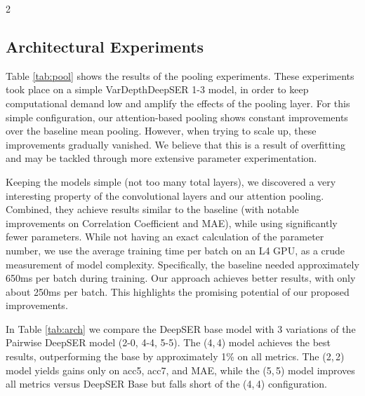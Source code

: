 \documentclass[10pt]{article}
\begin{document}
\begin{multicols}{2}
\subsection{Architectural Experiments}
\par Table \ref{tab:pool} shows the results of the pooling experiments. These experiments took place on a simple VarDepthDeepSER 1-3 model, in order to keep computational demand low and amplify the effects of the pooling layer. For this simple configuration, our attention-based pooling shows constant improvements over the baseline mean pooling. However, when trying to scale up, these improvements gradually vanished. We believe that this is a result of overfitting and may be tackled through more extensive parameter experimentation.
\par Keeping the models simple (not too many total layers), we discovered a very interesting property of the convolutional layers and our attention pooling. Combined, they achieve results similar to the baseline (with notable improvements on Correlation Coefficient and MAE), while using significantly fewer parameters. While not having an exact calculation of the parameter number, we use the average training time per batch on an L4 GPU, as a crude measurement of model complexity. Specifically, the baseline needed approximately 650ms per batch during training. Our approach achieves better results, with only about 250ms per batch. This highlights the promising potential of our proposed improvements.
\par In Table \ref{tab:arch} we compare the DeepSER base model with 3 variations of the Pairwise DeepSER model (2-0, 4-4, 5-5). The (4, 4) model achieves the best results, outperforming the base by approximately 1\% on all metrics. The (2, 2) model yields gains only on acc5, acc7, and MAE, while the (5, 5) model improves all metrics versus DeepSER Base but falls short of the (4, 4) configuration.

\end{multicols}
\end{document}
